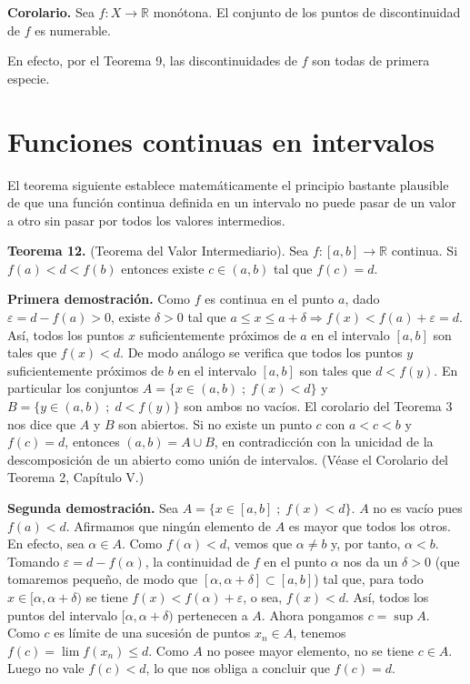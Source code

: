 \documentclass[12pt,oneside]{book}
\begin{document}
\textbf{Corolario.} Sea \(f: X \to \mathbb{R}\) monótona. El conjunto de los puntos de discontinuidad de \(f\) es numerable.

En efecto, por el Teorema 9, las discontinuidades de \(f\) son todas de primera especie.

\section{Funciones continuas en intervalos}

El teorema siguiente establece matemáticamente el principio bastante plausible de que una función continua definida en un intervalo no puede pasar de un valor a otro sin pasar por todos los valores intermedios.

\textbf{Teorema 12.} (Teorema del Valor Intermediario). Sea \(f: [a, b] \to \mathbb{R}\) continua. Si \(f(a) < d < f(b)\) entonces existe \(c \in (a, b)\) tal que \(f(c) = d\).

\textbf{Primera demostración.} Como \(f\) es continua en el punto \(a\), dado \(\varepsilon = d - f(a) > 0\), existe \(\delta > 0\) tal que \(a \leq x \leq a + \delta \Rightarrow f(x) < f(a) + \varepsilon = d\). Así, todos los puntos \(x\) suficientemente próximos de \(a\) en el intervalo \([a, b]\) son tales que \(f(x) < d\). De modo análogo se verifica que todos los puntos \(y\) suficientemente próximos de \(b\) en el intervalo \([a, b]\) son tales que \(d < f(y)\). En particular los conjuntos \(A = \{x \in (a, b) \; ; \; f(x) < d\}\) y \(B = \{y \in (a, b) \; ; \; d < f(y)\}\) son ambos no vacíos. El corolario del Teorema 3 nos dice que \(A\) y \(B\) son abiertos. Si no existe un punto \(c\) con \(a < c < b\) y \(f(c) = d\), entonces \((a, b) = A \cup B\), en contradicción con la unicidad de la descomposición de un abierto como unión de intervalos. (Véase el Corolario del Teorema 2, Capítulo V.)

\textbf{Segunda demostración.} Sea \(A = \{x \in [a, b] \; ; \; f(x) < d\}\). \(A\) no es vacío pues \(f(a) < d\). Afirmamos que ningún elemento de \(A\) es mayor que todos los otros. En efecto, sea \(\alpha \in A\). Como \(f(\alpha) < d\), vemos que \(\alpha \neq b\) y, por tanto, \(\alpha < b\). Tomando \(\varepsilon = d - f(\alpha)\), la continuidad de \(f\) en el punto \(\alpha\) nos da un \(\delta > 0\) (que tomaremos pequeño, de modo que \([\alpha, \alpha + \delta] \subset [a, b]\)) tal que, para todo \(x \in [\alpha, \alpha + \delta)\) se tiene \(f(x) < f(\alpha) + \varepsilon\), o sea, \(f(x) < d\). Así, todos los puntos del intervalo \([\alpha, \alpha + \delta)\) pertenecen a \(A\). Ahora pongamos \(c = \sup A\). Como \(c\) es límite de una sucesión de puntos \(x_n \in A\), tenemos \(f(c) = \lim f(x_n) \leq d\). Como \(A\) no posee mayor elemento, no se tiene \(c \in A\). Luego no vale \(f(c) < d\), lo que nos obliga a concluir que \(f(c) = d\).
\end{document}
